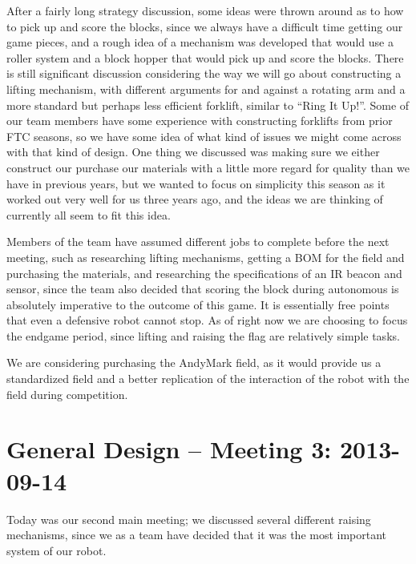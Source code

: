 \documentclass{article}
\begin{document}
After a fairly long strategy discussion, some ideas were thrown around as to how to pick up and score the blocks, since we always have a difficult time getting our game pieces, and a rough idea of a mechanism was developed that would use a roller system and a block hopper that would pick up and score the blocks. There is still significant discussion considering the way we will go about constructing a lifting mechanism, with different arguments for and against a rotating arm and a more standard but perhaps less efficient forklift, similar to ``Ring It Up!''. Some of our team members have some experience with constructing forklifts from prior FTC seasons, so we have some idea of what kind of issues we might come across with that kind of design. One thing we discussed was making sure we either construct our purchase our materials with a little more regard for quality than we have in previous years, but we wanted to focus on simplicity this season as it worked out very well for us three years ago, and the ideas we are thinking of currently all seem to fit this idea.

Members of the team have assumed different jobs to complete before the next meeting, such as researching lifting mechanisms, getting a BOM for the field and purchasing the materials, and researching the specifications of an IR beacon and sensor, since the team also decided that scoring the block during autonomous is absolutely imperative to the outcome of this game. It is essentially free points that even a defensive robot cannot stop. As of right now we are choosing to focus the endgame period, since lifting and raising the flag are relatively simple tasks. 

We are considering purchasing the AndyMark field, as it would provide us a standardized field and a better replication of the interaction of the robot with the field during competition. 

\newpage
\section{General Design -- Meeting 3: 2013-09-14}
Today was our second main meeting; we discussed several different raising mechanisms, since we as a team have decided that it was the most important system of our robot.
\end{document}
